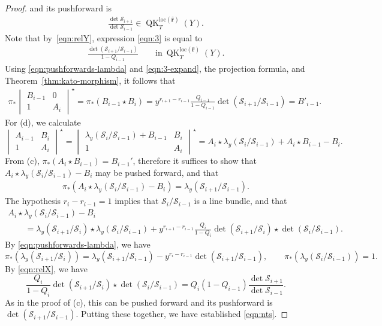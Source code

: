 \documentclass[pdftex]{sigma}
\numberwithin{equation}{section}
\theoremstyle{definition}
\DeclareMathOperator{\QK}{QK}
\def\loc{{\mathrm{loc}}}
\newcommand{\cS}{{\mathcal S}}
\begin{document}
\begin{proof}
 and its pushforward is
\begin{gather}\label{eqn:3}
 \frac{\det\cS_{i+1}}{\det\cS_{i-1}}\in \QK_T^{\loc(\mathbf{\hat r})}(Y).
\end{gather}
Note that by~\eqref{eqn:relY},
expression \eqref{eqn:3} is equal to
\begin{gather*}
 \frac{\det\left(\cS_{i+1}/\cS_{i-1}\right)}{1-Q_{i-1}}\qquad \text{in} \ \QK_T^{\loc(\mathbf{\hat r})}(Y).
\end{gather*}
Using \eqref{eqn:pushforwards-lambda} and \eqref{eqn:3-expand}, the projection formula, and Theorem~\ref{thm:kato-morphism}, it follows that
\begin{gather*}
 \pi_*\begin{vmatrix}
 B_{i-1} & 0\\
 1 & A_{i}
 \end{vmatrix}^\star=\pi_*\left(B_{i-1}\star B_i\right)=y^{r_{i+1}-r_{i-1}}\frac{Q_{i-1}}{1-Q_{i-1}}\det\left(\cS_{i+1}/\cS_{i-1}\right)=B'_{i-1}.
\end{gather*}
 For (d), we calculate
 \[ \begin{vmatrix}
 A_{i-1} & B_i\\1 & A_i
 \end{vmatrix}^\star
 = \begin{vmatrix}
 \lambda_y(\cS_{i}/\cS_{i-1}) + B_{i-1} & B_i\\1 & A_i
 \end{vmatrix}^\star
 = A_i \star \lambda_y(\cS_{i}/\cS_{i-1}) + A_i \star B_{i-1} - B_i. \]
 From (c), $\pi_* (A_i \star B_{i-1}) = B_{i-1}'$, therefore it suffices to show that
 $A_i \star \lambda_y(\cS_{i}/\cS_{i-1}) - B_i$ may be pushed forward, and that
 \begin{gather}\label{eqn:nts}
 \pi_*\left(A_i \star \lambda_y(\cS_{i}/\cS_{i-1}) - B_i\right) = \lambda_y(\cS_{i+1}/\cS_{i-1}) .
 \end{gather}
 The hypothesis $r_i - r_{i-1} =1$ implies that $\cS_i/\cS_{i-1}$ is a line bundle, and that
 \begin{gather*}%
 A_i \star \lambda_y(\cS_{i}/\cS_{i-1}) - B_i\\
 \qquad{} = \lambda_y(\cS_{i+1}/\cS_{i}) \star \lambda_y(\cS_{i}/\cS_{i-1})
 + y^{r_{i+1}-r_{i-1}} \frac{Q_i}{1-Q_i} \det (\cS_{i+1}/\cS_{i}) \star \det (\cS_{i}/\cS_{i-1}) .
 \end{gather*}
 By \eqref{eqn:pushforwards-lambda}, we have
 \[
 \pi_*(\lambda_y(\cS_{i+1}/\cS_{i}))=\lambda_y(\cS_{i+1}/\cS_{i-1})-y^{r_i-r_{i-1}}\det(\cS_{i+1}/\cS_{i-1}), \qquad\pi_*(\lambda_y(\cS_{i}/\cS_{i-1}))=1.
 \]
 By \eqref{eqn:relX}, we have
 \[
 \frac{Q_i}{1-Q_i} \det (\cS_{i+1}/\cS_{i}) \star \det (\cS_{i}/\cS_{i-1}) = Q_i(1-Q_{i-1})\frac{\det\cS_{i+1}}{\det \cS_{i-1}}.
 \]
 As in the proof of (c), this can be pushed forward and its pushforward is $\det(\cS_{i+1}/\cS_{i-1})$. Putting these together, we have established \eqref{eqn:nts}.
\end{proof}
\end{document}

